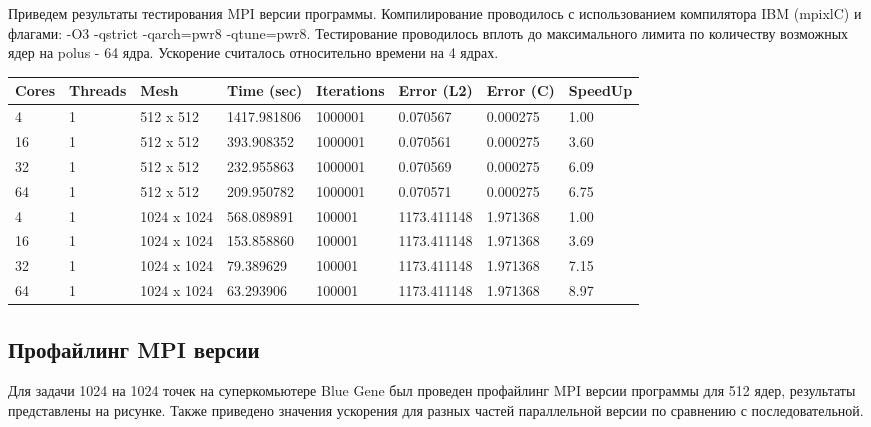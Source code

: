 \documentclass[12pt]{article}
\begin{document}
Приведем результаты тестирования MPI версии программы. Компилирование проводилось 
с использованием компилятора IBM (mpixlC) и флагами: -O3 -qstrict -qarch=pwr8 -qtune=pwr8.
Тестирование проводилось вплоть до максимального лимита по количеству возможных ядер на polus - 64 ядра. Ускорение считалось относительно времени на 4 ядрах.
\begin{center}
\begin{tabular}{llllllll}
Cores & Threads & Mesh & Time (sec) & Iterations & Error (L2) & Error (C) & SpeedUp \\
\hline
4 & 1 & 512 x 512 & 1417.981806 & 1000001 & 0.070567 & 0.000275 & 1.00 \\
16 & 1 & 512 x 512 & 393.908352 & 1000001 & 0.070561 & 0.000275 & 3.60 \\
32 & 1 & 512 x 512 & 232.955863 & 1000001 & 0.070569 & 0.000275 & 6.09 \\
64 & 1 & 512 x 512 & 209.950782 & 1000001 & 0.070571 & 0.000275 & 6.75 \\
\hline
4  & 1 & 1024 x 1024 & 568.089891 & 100001 & 1173.411148 & 1.971368 & 1.00 \\
16 & 1 & 1024 x 1024 & 153.858860 & 100001 & 1173.411148 & 1.971368 & 3.69 \\
32 & 1 & 1024 x 1024 & 79.389629  & 100001 & 1173.411148 & 1.971368 & 7.15 \\
64 & 1 & 1024 x 1024 & 63.293906  & 100001 & 1173.411148 & 1.971368 & 8.97 \\
\hline
\end{tabular}
\end{center}

\newpage

\subsection{Профайлинг MPI версии}

Для задачи 1024 на 1024 точек на суперкомьютере Blue Gene был проведен профайлинг MPI версии программы для 512 ядер, 
результаты представлены на рисунке. Также приведено значения ускорения для разных частей параллельной версии по сравнению с последовательной. 
\end{document}
